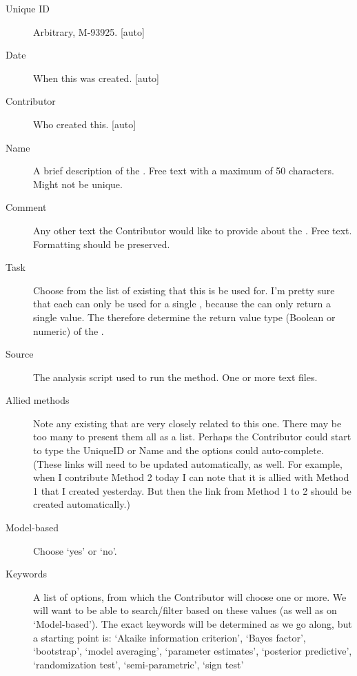 \begin{description}
    \item[Unique ID] Arbitrary, \eg M-93925. [auto]
    \item[Date] When this was created. [auto]
    \item[Contributor] Who created this. [auto]
    \item[Name] A brief description of the \Method.
            Free text with a maximum of 50 characters.  Might not be unique.
    \item[Comment] Any other text the Contributor would like to provide about the \Method.
            Free text.  Formatting should be preserved.
    \item[Task] Choose from the list of existing \Tasks that this \Method is be used for.
            I'm pretty sure that each \Method can only be used for a single \Task, because the \Method can only return a single value.
            The \Task therefore determine the return value type (Boolean or numeric) of the \Method.
    \item[Source] The analysis script used to run the method.  One or more text files.
    \item[Allied methods] Note any existing \Methods that are very closely related to this one.
            There may be too many \Methods to present them all as a list.  Perhaps the Contributor could start to type the UniqueID or Name and the options could auto-complete.
            (These links will need to be updated automatically, as well.  For example, when I contribute Method 2 today I can note that it is allied with Method 1 that I created yesterday.  But then the link from Method 1 to 2 should be created automatically.)
    \item[Model-based] Choose `yes' or `no'.
    \item[Keywords] A list of options, from which the Contributor will choose one or more.
            We will want to be able to search/filter \Methods based on these values (as well as on `Model-based').
            The exact keywords will be determined as we go along, but a starting point is:
                `Akaike information criterion',
                `Bayes factor',
                `bootstrap',
                `model averaging',
                `parameter estimates',
                `posterior predictive',
                `randomization test',
                `semi-parametric',
                `sign test'
\end{description}

